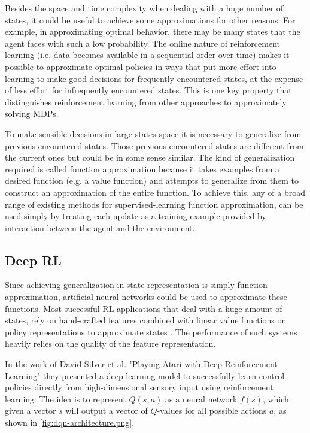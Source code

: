 \documentclass{article}
\begin{document}
Besides the space and time complexity when dealing with a huge number of states, it could be useful to achieve some approximations for other reasons. For example, in approximating optimal behavior, there may be many states that the agent faces with such a low probability. The online nature of reinforcement learning (i.e. data becomes available in a sequential order over time) makes it possible to approximate optimal policies in ways that put more effort into learning to make good decisions for frequently encountered states, at the expense of less effort for infrequently encountered states. This is one key property that distinguishes reinforcement learning from other approaches to approximately solving MDPs.

To make sensible decisions in large states space it is necessary to generalize from previous encountered states. Those previous encountered states are different from the current ones but could be in some sense similar. The kind of generalization required is called function approximation because it takes examples from a desired function (e.g. a value function) and attempts to generalize from them to construct an approximation of the entire function. To achieve this, any of a broad range of existing methods for supervised-learning function approximation, can be used simply by treating each update as a training example provided by interaction between the agent and the environment.

\subsection{ Deep RL}
Since achieving generalization in state representation is simply function approximation, artificial neural networks could be used to approximate these functions. 
Most successful RL applications that deal with a huge amount of states, rely on hand-crafted features combined with linear value functions or policy representations to approximate states \cite{mnih2013atari}. The performance of such systems heavily relies on the quality of the feature representation.

In the work of David Silver et al. "Playing Atari with Deep Reinforcement Learning" \cite{mnih2013atari} they presented a deep learning model to successfully learn control policies directly from high-dimensional sensory input using reinforcement learning. The idea is to represent $Q(s,a)$ as a neural network  $f(s)$, which given a vector $s$ will output a vector of $Q$-values for all possible actions $a$, as shown in \autoref{fig:dqn-architecture.png}.
\end{document}
